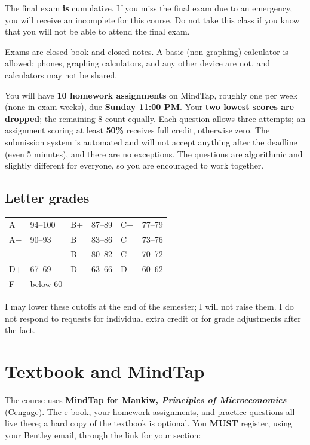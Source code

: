 \documentclass[11pt,letterpaper]{article}
\begin{document}
The final exam \textbf{is} cumulative. If you miss the final exam due to an emergency, you will receive an incomplete for this course. Do not take this class if you know that you will not be able to attend the final exam.

Exams are closed book and closed notes. A basic (non-graphing) calculator is allowed; phones, graphing calculators, and any other device are not, and calculators may not be shared.

You will have \textbf{10 homework assignments} on MindTap, roughly one per week (none in exam weeks), due \textbf{Sunday 11:00 PM}. Your \textbf{two lowest scores are dropped}; the remaining 8 count equally. Each question allows three attempts; an assignment scoring at least \textbf{50\%} receives full credit, otherwise zero. The submission system is automated and will not accept anything after the deadline (even 5 minutes), and there are no exceptions. The questions are algorithmic and slightly different for everyone, so you are encouraged to work together.

\subsection*{Letter grades}
\begin{center}
\begin{tabular}{@{}llllll@{}}
\toprule
A & 94--100 & B+ & 87--89 & C+ & 77--79 \\
A$-$ & 90--93 & B & 83--86 & C & 73--76 \\
 & & B$-$ & 80--82 & C$-$ & 70--72 \\
\midrule
D+ & 67--69 & D & 63--66 & D$-$ & 60--62 \\
F & below 60 & & & & \\
\bottomrule
\end{tabular}
\end{center}
I may lower these cutoffs at the end of the semester; I will not raise them. I do not respond to requests for individual extra credit or for grade adjustments after the fact.

\section*{Textbook and MindTap}

The course uses \textbf{MindTap for Mankiw, \textit{Principles of Microeconomics}} (Cengage). The e-book, your homework assignments, and practice questions all live there; a hard copy of the textbook is optional. You \textbf{MUST} register, using your Bentley email, through the link for your section:
\end{document}
